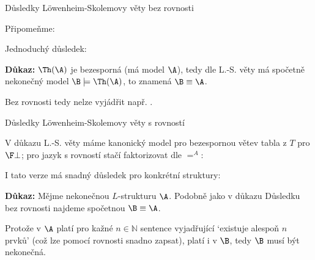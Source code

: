\documentclass{beamer}
\begin{document}
\begin{frame}{Důsledky Löwenheim-Skolemovy věty bez rovnosti}

    \pause
    Připomeňme:

    \smallskip

    \pause

    \medskip

    \pause
    Jednoduchý důsledek:

    \smallskip

    \pause

    \pause
    \textbf{Důkaz:} $\Th(\A)$ je bezesporná (má model $\A$), tedy dle L.-S. věty má spočetně nekonečný model $\B\models\Th(\A)$, to znamená $\B\equiv\A$.\hfill\qedsymbol

    \medskip

    \pause
    Bez rovnosti tedy nelze vyjádřit např. .

\end{frame}


\begin{frame}{Důsledky Löwenheim-Skolemovy věty s rovností}

    \pause
    V důkazu L.-S. věty máme kanonický model pro bezespornou větev tabla z $T$ pro $\F\bot$; pro jazyk s rovností stačí faktorizovat dle $=^A$:

    \smallskip

    \pause

    \medskip

    \pause
    I tato verze má snadný důsledek pro konkrétní struktury:

    \smallskip

    \pause

    \smallskip

    \pause
    \textbf{Důkaz:}
    Mějme nekonečnou $L$-strukturu $\A$. Podobně jako v důkazu Důsledku bez rovnosti najdeme \alert{spočetnou} $\B\equiv\A$. 
    
    \pause
    Protože v $\A$ platí pro kažné $n\in\mathbb N$ sentence vyjadřující `existuje alespoň $n$ prvků' (což lze pomocí rovnosti snadno zapsat), platí i v $\B$, tedy $\B$ musí být nekonečná.\hfill\qedsymbol

\end{frame}
\end{document}
